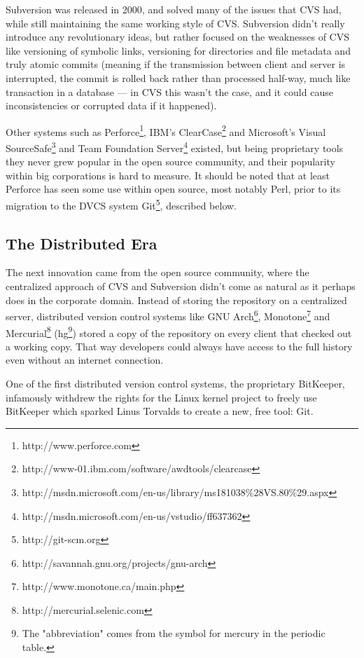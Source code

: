 \documentclass{llncs}
\begin{document}
Subversion was released in 2000, and solved many of the issues that
CVS had, while still maintaining the same working style of
CVS. Subversion didn't really introduce any revolutionary ideas, but
rather focused on the weaknesses of CVS like versioning of symbolic
links, versioning for directories and file metadata and truly atomic
commits (meaning if the transmission between client and server is
interrupted, the commit is rolled back rather than processed half-way,
much like transaction in a database \cite{subversion} --- in CVS this
wasn't the case, and it could cause inconsistencies or corrupted data
if it happened).

Other systems such as Perforce\footnote{
	http://www.perforce.com
},
IBM's ClearCase\footnote{
  http://www-01.ibm.com/software/awdtools/clearcase } and Microsoft's
Visual SourceSafe\footnote{
  http://msdn.microsoft.com/en-us/library/ms181038\%28VS.80\%29.aspx }
and Team Foundation Server\footnote{
  http://msdn.microsoft.com/en-us/vstudio/ff637362 } existed, but
being proprietary tools they never grew popular in the open source
community, and their popularity within big corporations is hard to
measure. It should be noted that at least Perforce has seen some use 
within open source, most notably Perl, prior to its migration to the
DVCS system Git\footnote{
	http://git-scm.org
}, described below.

\subsection{The Distributed Era}

The next innovation came from the open source community, where the
centralized approach of CVS and Subversion didn't come as natural as
it perhaps does in the corporate domain. Instead of storing the
repository on a centralized server, distributed version control
systems like GNU Arch\footnote{
  http://savannah.gnu.org/projects/gnu-arch }, Monotone\footnote{
  http://www.monotone.ca/main.php } and Mercurial\footnote{
  http://mercurial.selenic.com } (hg\footnote{ The "abbreviation"
  comes from the symbol for mercury in the periodic table. }) stored a
copy of the repository on every client that checked out a working
copy. That way developers could always have access to the full history
even without an internet connection.

One of the first distributed version control systems, the proprietary
BitKeeper, infamously withdrew the rights for the Linux kernel project
to freely use BitKeeper \cite{robert06}\cite{shaikh02} which sparked
Linus Torvalds to create a new, free tool: Git.
\end{document}
